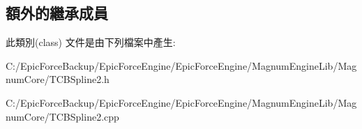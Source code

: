 \subsection*{額外的繼承成員}


此類別(class) 文件是由下列檔案中產生\+:\begin{DoxyCompactItemize}
\item 
C\+:/\+Epic\+Force\+Backup/\+Epic\+Force\+Engine/\+Epic\+Force\+Engine/\+Magnum\+Engine\+Lib/\+Magnum\+Core/T\+C\+B\+Spline2.\+h\item 
C\+:/\+Epic\+Force\+Backup/\+Epic\+Force\+Engine/\+Epic\+Force\+Engine/\+Magnum\+Engine\+Lib/\+Magnum\+Core/T\+C\+B\+Spline2.\+cpp\end{DoxyCompactItemize}
